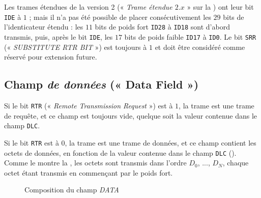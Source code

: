 Les trames étendues de la version 2 (« \emph{Trame étendue $2.x$} » sur la ) ont leur bit \texttt{IDE} à $1$ ; mais il n'a pas été possible de placer consécutivement les $29$ bits de l'identicateur étendu : les $11$ bits de poids fort \texttt{ID28} à \texttt{ID18} sont d'abord transmis, puis, après le bit \texttt{IDE}, les $17$ bits de poids faible \texttt{ID17} à \texttt{ID0}. Le bit \texttt{SRR} (« \emph{SUBSTITUTE RTR BIT} ») est toujours à $1$  et doit être considéré comme réservé pour extension future.






\subsection{Champ \emph{de données} (« Data Field »)}

Si le bit \texttt{RTR} (« \emph{Remote Transmission Request} ») est à $1$, la trame est une trame de requête, et ce champ est toujours vide, quelque soit la valeur contenue dans le champ \texttt{DLC}.

Si le bit \texttt{RTR} est à $0$, la trame est une trame de données, et ce champ contient les octets de données, en fonction de la valeur contenue dans le champ \texttt{DLC} (). Comme le montre la , les octets sont transmis dans l'ordre \texttt{$D_0$}, ..., \texttt{$D_N$}, chaque octet étant transmis en commençant par le poids fort.



\begin{figure}[h]
  \centering
  \caption{Composition du champ \emph{DATA}}
\end{figure}





